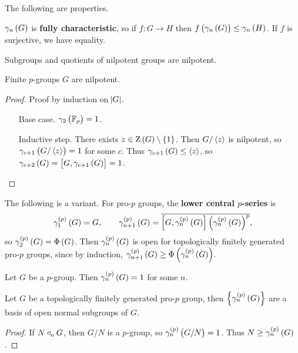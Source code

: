 The following are properties.

\begin{proposition}
$ \gamma_n\br{G} $ is \textbf{fully characteristic}, so if $ f : G \to H $ then $ f\br{\gamma_n\br{G}} \le \gamma_n\br{H} $. If $ f $ is surjective, we have equality.
\end{proposition}

\begin{proposition}
Subgroups and quotients of nilpotent groups are nilpotent.
\end{proposition}

\begin{proposition}
Finite $ p $-groups $ G $ are nilpotent.
\end{proposition}

\begin{proof}
Proof by induction on $ \abs{G} $.
\begin{itemize}[leftmargin=1in]
\item[Base case.] $ \gamma_2\br{\FF_p} = 1 $.
\item[Inductive step.] There exists $ z \in \Z\br{G} \setminus \cbr{1} $. Then $ G / \left\langle z \right\rangle $ is nilpotent, so $ \gamma_{c + 1}\br{G / \abr{z}} = 1 $ for some $ c $. Thus $ \gamma_{c + 1}\br{G} \le \abr{z} $, so $ \gamma_{c + 2}\br{G} = \sbr{G, \gamma_{c + 1}\br{G}} = 1 $.
\end{itemize}
\end{proof}

The following is a variant. For pro-$ p $ groups, the \textbf{lower central $ p $-series} is
$$ \gamma_1^{\br{p}}\br{G} = G, \qquad \gamma_{n + 1}^{\br{p}}\br{G} = \overline{\sbr{G, \gamma_n^{\br{p}}\br{G}}\br{\gamma_n^{\br{p}}\br{G}}^p}, $$
so $ \gamma_2^{\br{p}}\br{G} = \Phi\br{G} $. Then $ \gamma_n^{\br{p}}\br{G} $ is open for topologically finitely generated pro-$ p $ groups, since by induction, $ \gamma_{n + 1}^{\br{p}}\br{G} \ge \Phi\br{\gamma_n^{\br{p}}\br{G}} $.

\begin{proposition}
Let $ G $ be a $ p $-group. Then $ \gamma_n^{\br{p}}\br{G} = 1 $ for some $ n $.
\end{proposition}

\begin{proposition}
Let $ G $ be a topologically finitely generated pro-$ p $ group, then $ \cbr{\gamma_n^{\br{p}}\br{G}} $ are a basis of open normal subgroups of $ G $.
\end{proposition}

\begin{proof}
If $ N \triangleleft_{\mathrm{o}} G $, then $ G / N $ is a $ p $-group, so $ \gamma_n^{\br{p}}\br{G / N} = 1 $. Thus $ N \ge \gamma_n^{\br{p}}\br{G} $.
\end{proof}

